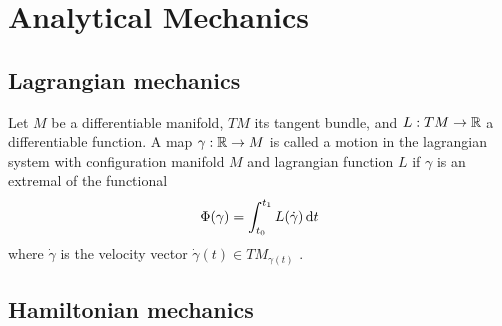 \chapter{Analytical Mechanics}

\section{Lagrangian mechanics}
\begin{definition}
    Let $M$ be a differentiable manifold, $TM$ its tangent bundle, and $L: TM \to \mathbb{R}$ a differentiable function. A map $\gamma: \mathbb{R} \to M$  is called a motion in the lagrangian system with configuration manifold $M$ and lagrangian function $L$ if $\gamma$ is an extremal of the functional
    $$ \Phi(\gamma) =  \int^{t_1}_{t_0} L\qty(\dot{\gamma})\dd{t}$$
    where $\dot{\gamma}$ is the velocity vector $\dot{\gamma}(t) \in TM_{\gamma(t)}$ \cite{Arnold1989}.
\end{definition}

\section{Hamiltonian mechanics}